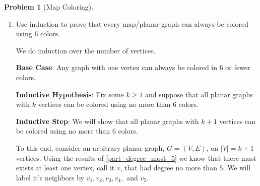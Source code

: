 \documentclass{article}
\theoremstyle{plain}
\theoremstyle{definition}
\newtheorem{problem}{Problem}
\begin{document}
\begin{problem}[Map Coloring]
\begin{enumerate}
\begin{enumerate}
            [Hint: Use the handshake lemma, the fact that \(2 |E| \geq 3 |F|\), and Euler's formula for planar graphs, i.e., \(|V| - |E| + |F| = 2\), to bound the average degree of the graph.]

            \begin{solution}
                Let \(d_v\) denote the degree of the vertex \(v \in V\). The average degree of a graph is then given by \(\bar{d} \coloneq \frac{1}{|V|}\sum_{v \in V} d_v\). By the hand shake lemma we have that \(\bar{d} = \frac{2 |E|}{|V|}\). We then do the follow using Euler's formula and the fact that \(2 |E| \geq 3 |F|\) (which follows from that fact that every edge touches exactly 2 faces and every face touches at least 3 edges).
                \begin{align*}
                    |V| - 2 &= |E| - |F| \\
                    |V| - 2 &\geq |E| - \frac{2}{3}|E| \\
                    3|V| - 6 &\geq |E| \\
                    6-\frac{12}{|V|} &\geq \frac{2 |E|}{|V|}
                \end{align*}
                Then, because \(|V| > 1\), we have that \(\frac{12}{|V|} > 0\) and thus \(\bar{d} < 6\). Thus implies that there must be at least on vertex with degree no more than \(5\).
            \end{solution}

            \item\label{6_color_thm} Use induction to prove that every map/planar graph can always be colored using 6 colors.

            \begin{solution}
                We do induction over the number of vertices.

                \textbf{Base Case}: Any graph with one vertex can always be colored in 6 or fewer colors.

                \textbf{Inductive Hypothesis}: Fix some \(k \geq 1\) and suppose that all planar graphs with \(k\) vertices can be colored using no more than \(6\) colors.

                \textbf{Inductive Step}: We will show that all planar graphs with \(k+1\) vertices can be colored using no more than \(6\) colors.

                To this end, consider an arbitrary planar graph, \(G=(V,E)\), on \(|V|=k+1\) vertices. Using the results of \cref{part_degree_most_5} we know that there must exists at least one vertex, call it \(v\), that had degree no more than \(5\). We will label it's neighbors by \(v_1,v_2,v_3,v_4,\) and \(v_5\).


\end{solution}
\end{enumerate}
\end{enumerate}
\end{problem}
\end{document}
